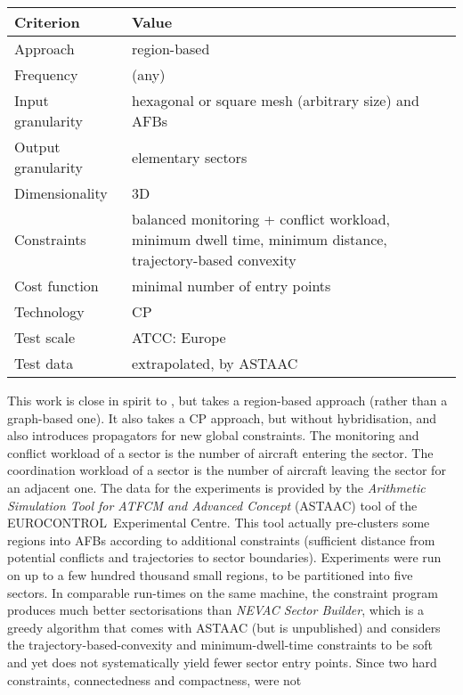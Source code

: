 \documentclass[a4paper,12pt]{article}
\newcommand{\EuroControl}{EUROCONTROL}
\begin{document}
\begin{center}
\begin{tabular}{|l|l|}
  \hline
  Criterion & Value \\
  \hline\hline
  Approach & region-based \\ \hline
  Frequency & (any) \\ \hline
  Input granularity & hexagonal or square mesh (arbitrary size) and AFBs \\ \hline
  Output granularity & elementary sectors \\ \hline
  Dimensionality & 3D \\ \hline
  Constraints & \parbox{11.5cm}{balanced monitoring + conflict
    workload, minimum dwell time, minimum distance,
    trajectory-based convexity} \\ \hline
  Cost function & minimal number of entry points \\ \hline
  Technology & CP \\ \hline
  Test scale & ATCC: Europe \\ \hline
  Test data & extrapolated, by ASTAAC \\ \hline
\end{tabular}
\end{center}
This work is close in spirit to \cite{TranDac:RAIRO05}, but takes a
region-based approach (rather than a graph-based one).  It also takes a
CP approach, but without hybridisation, and also introduces
propagators for new global constraints.
The monitoring and conflict workload of a sector is the number of
aircraft entering the sector.  The coordination workload of a sector
is the number of aircraft leaving the sector for an adjacent one.
The data for the experiments is provided by the \emph{Arithmetic
  Simulation Tool for ATFCM and Advanced Concept} (ASTAAC) tool of the
\EuroControl\ Experimental Centre.  This tool actually pre-clusters
some regions into AFBs according to additional constraints (sufficient
distance from potential conflicts and trajectories to sector
boundaries).
Experiments were run on up to a few hundred thousand small regions, to
be partitioned into five sectors.  In comparable run-times on the same
machine, the constraint program produces much better sectorisations
than \emph{NEVAC Sector Builder}, which is a greedy algorithm that
comes with ASTAAC (but is unpublished) and considers the
trajectory-based-convexity and minimum-dwell-time constraints to be
soft and yet does not systematically yield fewer sector entry points.
Since two hard constraints, connectedness and compactness, were not
\end{document}
